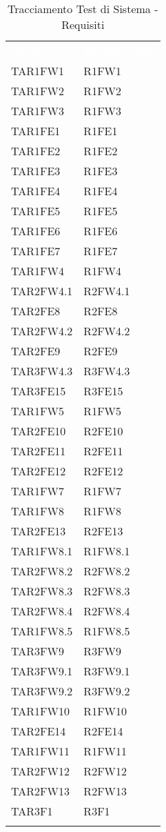 \renewcommand{\arraystretch}{1.5}
\begin{longtable}{ m{}<{\centering}  m{}<{\centering} }
	\rowcolor{darkblue}
	\textcolor{white}{\textbf{ID Test}} &\textcolor{white}{\textbf{ID Requisito}}\\ 
	 
	TAR1FW1 & R1FW1 \\
	TAR1FW2 &  R1FW2 \\
	TAR1FW3 & R1FW3 \\
	TAR1FE1 & R1FE1 \\
	TAR1FE2 & R1FE2 \\
	TAR1FE3 & R1FE3 \\
	TAR1FE4 & R1FE4 \\
	TAR1FE5 & R1FE5 \\
	TAR1FE6 & R1FE6 \\
	TAR1FE7 & R1FE7 \\
	TAR1FW4 & R1FW4 \\
	TAR2FW4.1 & R2FW4.1 \\
	TAR2FE8 & R2FE8 \\
	TAR2FW4.2 & R2FW4.2 \\
	TAR2FE9 & R2FE9 \\
	TAR3FW4.3 & R3FW4.3\\
	TAR3FE15 & R3FE15 \\
	TAR1FW5 & R1FW5 \\
	TAR2FE10 & R2FE10 \\	 
	TAR2FE11 & R2FE11 \\
	TAR2FE12 & R2FE12 \\
	TAR1FW7 & R1FW7 \\
	TAR1FW8 & R1FW8 \\
	TAR2FE13 & R2FE13 \\
	TAR1FW8.1 & R1FW8.1 \\
	TAR2FW8.2 & R2FW8.2 \\
	TAR2FW8.3 & R2FW8.3 \\
	TAR2FW8.4 & R2FW8.4 \\
	TAR1FW8.5 & R1FW8.5 \\
	TAR3FW9 & R3FW9 \\
	TAR3FW9.1 & R3FW9.1 \\
	TAR3FW9.2 & R3FW9.2 \\
	TAR1FW10 & R1FW10 \\
	TAR2FE14 & R2FE14  \\
	TAR1FW11 & R1FW11 \\
	TAR2FW12 & R2FW12 \\
	TAR2FW13 & R2FW13 \\
	TAR3F1 & R3F1 \\

\caption{Tracciamento Test di Sistema - Requisiti}
\end{longtable}